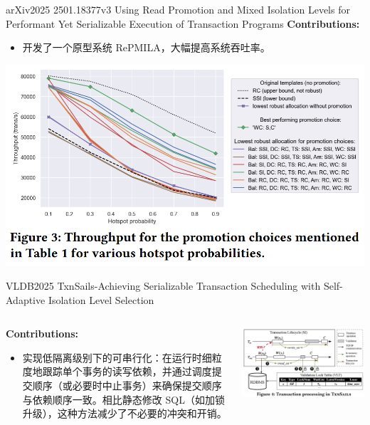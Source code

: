 \begin{frame}{arXiv2025 2501.18377v3 Using Read Promotion and Mixed Isolation Levels for Performant Yet Serializable Execution of Transaction Programs}
	\textbf{Contributions: }
	\begin{itemize}
		\item 开发了一个原型系统 RePMILA，大幅提高系统吞吐率。
	\end{itemize}
	\begin{center}
		\includegraphics[width=0.7\linewidth]{figs/throughput}
	\end{center}
\end{frame}

\begin{frame}{VLDB2025 TxnSails-Achieving Serializable Transaction Scheduling with Self-Adaptive Isolation Level Selection}
	\begin{columns}
		\begin{column}{0.5\textwidth}
			\textbf{Contributions: }
			\begin{itemize}
				\item 实现低隔离级别下的可串行化：在运行时细粒度地跟踪单个事务的读写依赖，并通过调度提交顺序（或必要时中止事务）来确保提交顺序与依赖顺序一致。相比静态修改 SQL（如加锁升级），这种方法减少了不必要的冲突和开销。
			\end{itemize}
		\end{column}
		\begin{column}{0.5\textwidth}
			\includegraphics[width=0.98\linewidth]{figs/TxnSails-txn-proc}
		\end{column}
	\end{columns}
\end{frame}

